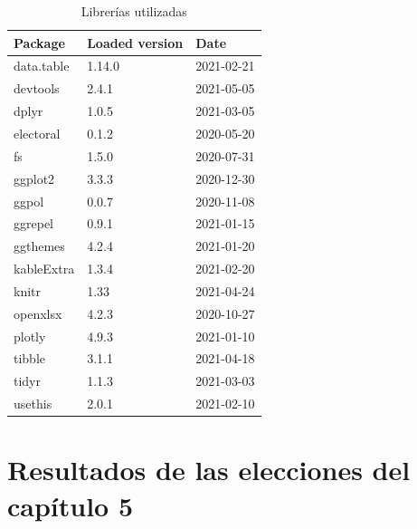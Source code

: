 \documentclass[12pt,a4paper,]{book}
\def\ifdoblecara{} %
\def\ifprincipal{} %
\numberwithin{dummy}{section}
\theoremstyle{ocrenumbox}
\theoremstyle{blacknumex}
\theoremstyle{blacknumbox}
\theoremstyle{ocrenum}
\theoremstyle{ocrenum}
\begin{document}
\renewcommand{\arraystretch}{0.6}
\begin{table}[!h]

\caption[ ]{\label{tab:Reproducibility-SessionInfo-R-packages}Librerías utilizadas}
\centering
\begin{tabular}[t]{lll}
\toprule
Package & Loaded version & Date\\
\midrule
data.table & 1.14.0 & 2021-02-21\\
devtools & 2.4.1 & 2021-05-05\\
dplyr & 1.0.5 & 2021-03-05\\
electoral & 0.1.2 & 2020-05-20\\
fs & 1.5.0 & 2020-07-31\\
\addlinespace
ggplot2 & 3.3.3 & 2020-12-30\\
ggpol & 0.0.7 & 2020-11-08\\
ggrepel & 0.9.1 & 2021-01-15\\
ggthemes & 4.2.4 & 2021-01-20\\
kableExtra & 1.3.4 & 2021-02-20\\
\addlinespace
knitr & 1.33 & 2021-04-24\\
openxlsx & 4.2.3 & 2020-10-27\\
plotly & 4.9.3 & 2021-01-10\\
tibble & 3.1.1 & 2021-04-18\\
tidyr & 1.1.3 & 2021-03-03\\
\addlinespace
usethis & 2.0.1 & 2021-02-10\\
\bottomrule
\end{tabular}
\end{table}
\renewcommand{\arraystretch}{1}

\ifdefined\ifprincipal
\else
\setlength{\parindent}{1em}
\pagestyle{fancy}
\setcounter{tocdepth}{4}
\tableofcontents

\fi

\ifdefined\ifdoblecara
\fancyhead{}{}
\fancyhead[LE,RO]{\scriptsize\rightmark}
\fancyfoot[LO,RE]{\scriptsize\slshape \leftmark}
\fancyfoot[C]{}
\fancyfoot[LE,RO]{\footnotesize\thepage}
\else
\fancyhead{}{}
\fancyhead[RO]{\scriptsize\rightmark}
\fancyfoot[LO]{\scriptsize\slshape \leftmark}
\fancyfoot[C]{}
\fancyfoot[RO]{\footnotesize\thepage}
\fi
\renewcommand{\headrulewidth}{0.4pt}
\renewcommand{\footrulewidth}{0.4pt}

\hypertarget{resultados-de-las-elecciones-del-capuxedtulo-5}{%
\chapter{Resultados de las elecciones del capítulo
5}\label{resultados-de-las-elecciones-del-capuxedtulo-5}}
\end{document}
